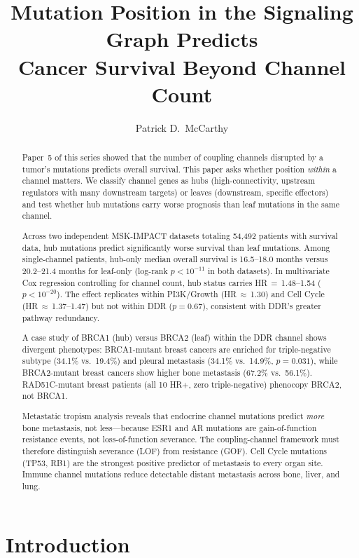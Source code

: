 \documentclass[11pt]{article}
\title{Mutation Position in the Signaling Graph Predicts\\
Cancer Survival Beyond Channel Count}
\author{Patrick D.\ McCarthy}
\date{}
\begin{document}
\maketitle

\begin{abstract}
Paper~5 of this series showed that the number of coupling channels
disrupted by a tumor's mutations predicts overall survival. This paper
asks whether position \emph{within} a channel matters. We classify
channel genes as hubs (high-connectivity, upstream regulators with many
downstream targets) or leaves (downstream, specific effectors) and test
whether hub mutations carry worse prognosis than leaf mutations in the
same channel.

Across two independent MSK-IMPACT datasets totaling 54{,}492 patients
with survival data, hub mutations predict significantly worse survival
than leaf mutations. Among single-channel patients, hub-only median
overall survival is 16.5--18.0 months versus 20.2--21.4 months for
leaf-only (log-rank $p < 10^{-11}$ in both datasets). In multivariate
Cox regression controlling for channel count, hub status carries
HR\,$=$\,1.48--1.54 ($p < 10^{-20}$). The effect replicates
within PI3K/Growth (HR\,$\approx$\,1.30) and Cell Cycle
(HR\,$\approx$\,1.37--1.47) but not within DDR ($p = 0.67$),
consistent with DDR's greater pathway redundancy.

A case study of BRCA1 (hub) versus BRCA2 (leaf) within the DDR channel
shows divergent phenotypes: BRCA1-mutant breast cancers are enriched
for triple-negative subtype (34.1\% vs.\ 19.4\%) and pleural
metastasis (34.1\% vs.\ 14.9\%, $p = 0.031$), while BRCA2-mutant
breast cancers show higher bone metastasis (67.2\% vs.\ 56.1\%).
RAD51C-mutant breast patients (all 10 HR+, zero triple-negative)
phenocopy BRCA2, not BRCA1.

Metastatic tropism analysis reveals that endocrine channel mutations
predict \emph{more} bone metastasis, not less---because ESR1 and AR
mutations are gain-of-function resistance events, not loss-of-function
severance. The coupling-channel framework must therefore distinguish
severance (LOF) from resistance (GOF). Cell Cycle mutations (TP53,
RB1) are the strongest positive predictor of metastasis to every
organ site. Immune channel mutations reduce detectable distant
metastasis across bone, liver, and lung.
\end{abstract}

\section{Introduction}
\label{sec:intro}
\end{document}
